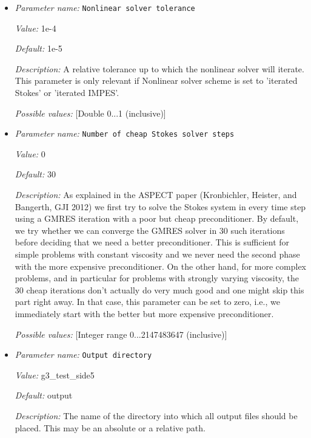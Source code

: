 \begin{itemize}
{\it Possible values:} [Selection IMPES|iterated IMPES|iterated Stokes|Stokes only|Advection only ]
\item {\it Parameter name:} {\tt Nonlinear solver tolerance}
\label{parameters:Nonlinear solver tolerance}


{\it Value:} 1e-4


{\it Default:} 1e-5


{\it Description:} A relative tolerance up to which the nonlinear solver will iterate. This parameter is only relevant if Nonlinear solver scheme is set to 'iterated Stokes' or 'iterated IMPES'.


{\it Possible values:} [Double 0...1 (inclusive)]
\item {\it Parameter name:} {\tt Number of cheap Stokes solver steps}
\label{parameters:Number of cheap Stokes solver steps}


{\it Value:} 0


{\it Default:} 30


{\it Description:} As explained in the ASPECT paper (Kronbichler, Heister, and Bangerth, GJI 2012) we first try to solve the Stokes system in every time step using a GMRES iteration with a poor but cheap preconditioner. By default, we try whether we can converge the GMRES solver in 30 such iterations before deciding that we need a better preconditioner. This is sufficient for simple problems with constant viscosity and we never need the second phase with the more expensive preconditioner. On the other hand, for more complex problems, and in particular for problems with strongly varying viscosity, the 30 cheap iterations don't actually do very much good and one might skip this part right away. In that case, this parameter can be set to zero, i.e., we immediately start with the better but more expensive preconditioner.


{\it Possible values:} [Integer range 0...2147483647 (inclusive)]
\item {\it Parameter name:} {\tt Output directory}
\label{parameters:Output directory}


{\it Value:} g3_test_side5


{\it Default:} output


{\it Description:} The name of the directory into which all output files should be placed. This may be an absolute or a relative path.



\end{itemize}
